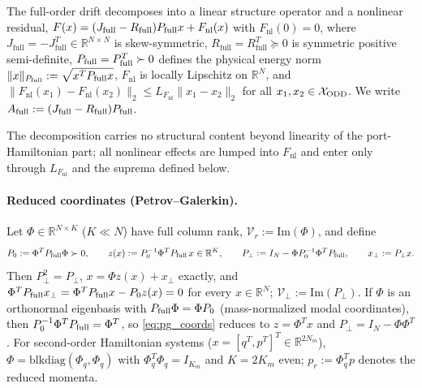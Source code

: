 \begin{assumption}
\label{assump:generic}
The full-order drift decomposes into a linear structure operator and a nonlinear residual, \(F(x) = (J_{\mathrm{full}} - R_{\mathrm{full}})P_{\mathrm{full}} x + F_{\mathrm{nl}}(x)\) with \(F_{\mathrm{nl}}(0) = 0\), where \(J_{\mathrm{full}} = -J_{\mathrm{full}}^T \in \mathbb{R}^{N \times N}\) is skew-symmetric, \(R_{\mathrm{full}} = R_{\mathrm{full}}^T \succeq 0\) is symmetric positive semi-definite, \(P_{\mathrm{full}} = P_{\mathrm{full}}^T \succ 0\) defines the physical energy norm \(\|x\|_{P_{\mathrm{full}}} := \sqrt{x^T P_{\mathrm{full}} x}\), \(F_{\mathrm{nl}}\) is locally Lipschitz on \(\mathbb{R}^N\), and \(\|F_{\mathrm{nl}}(x_1) - F_{\mathrm{nl}}(x_2)\|_2 \le L_{F_{\mathrm{nl}}}\|x_1 - x_2\|_2\) for all \(x_1, x_2 \in \mathcal{X}_{\mathrm{ODD}}\). We write \(A_{\mathrm{full}} := (J_{\mathrm{full}} - R_{\mathrm{full}})P_{\mathrm{full}}\).
\end{assumption}

The decomposition carries no structural content beyond linearity of the port-Hamiltonian part; all nonlinear effects are lumped into \(F_{\mathrm{nl}}\) and enter only through \(L_{F_{\mathrm{nl}}}\) and the suprema defined below.

\paragraph{Reduced coordinates (Petrov--Galerkin).}
Let \(\Phi \in \mathbb{R}^{N \times K}\) (\(K \ll N\)) have full column rank, \(\mathcal{V}_r := \mathrm{Im}(\Phi)\), and define
\begin{equation}
\label{eq:pg_coords}
P_0 := \Phi^T P_{\mathrm{full}} \Phi \succ 0, \qquad z(x) := P_0^{-1}\Phi^T P_{\mathrm{full}}\, x \in \mathbb{R}^K, \qquad P_\perp := I_N - \Phi P_0^{-1}\Phi^T P_{\mathrm{full}}, \qquad x_\perp := P_\perp x .
\end{equation}
Then \(P_\perp^2 = P_\perp\), \(x = \Phi z(x) + x_\perp\) exactly, and \(\Phi^TP_{\mathrm{full}} x_\perp = \Phi^TP_{\mathrm{full}} x - P_0 z(x) = 0\) for every \(x \in \mathbb{R}^N\); \(\mathcal{V}_\perp := \mathrm{Im}(P_\perp)\). If \(\Phi\) is an orthonormal eigenbasis with \(P_{\mathrm{full}}\Phi = \Phi P_0\) (mass-normalized modal coordinates), then \(P_0^{-1}\Phi^TP_{\mathrm{full}} = \Phi^T\), so \eqref{eq:pg_coords} reduces to \(z = \Phi^T x\) and \(P_\perp = I_N - \Phi\Phi^T\). For second-order Hamiltonian systems (\(x = [q^T, p^T]^T \in \mathbb{R}^{2N_m}\)), \(\Phi = \mathrm{blkdiag}(\Phi_q, \Phi_q)\) with \(\Phi_q^T\Phi_q = I_{K_m}\) and \(K = 2K_m\) even; \(p_r := \Phi_q^T p\) denotes the reduced momenta.


